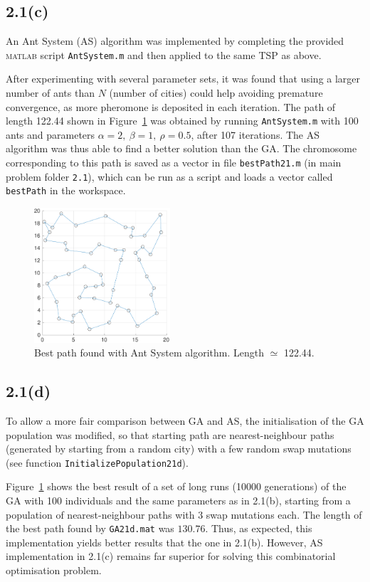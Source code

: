 \documentclass[12pt,titlepage]{article}
\begin{document}
\subsection*{2.1(c)}

An Ant System (AS) algorithm was implemented by completing the provided \textsc{matlab} script \texttt{AntSystem.m} and then applied to the same TSP as above. 

After experimenting with several parameter sets, it was found that using a larger number of ants than $N$ (number of cities) could help avoiding premature convergence, as more pheromone is deposited in each iteration. The path of length 122.44 shown in Figure~\ref{fig:1c} was obtained by running \texttt{AntSystem.m} with 100 ants and parameters $\alpha = 2, \ \beta = 1, \ \rho = 0.5$, after 107 iterations. The AS algorithm was thus able to find a better solution than the GA. The chromosome corresponding to this path is saved as a vector in file \texttt{bestPath21.m} (in main problem folder \texttt{2.1}), which can be run as a script and loads a vector called \texttt{bestPath} in the workspace.

\begin{figure}[htbp]
\centering
\includegraphics[width=0.45\textwidth]{Figures/2c_pathPlot}
\caption{\footnotesize Best path found with Ant System algorithm. Length $\simeq$ 122.44.}
\label{fig:1c}
\end{figure}

\subsection*{2.1(d)}
To allow a more fair comparison between GA and AS, the initialisation of the GA population was modified, so that starting path are nearest-neighbour paths (generated by starting from a random city) with a few random swap mutations (see function \texttt{InitializePopulation21d}).

Figure~\ref{fig:1c} shows the best result of a set of long runs (10000 generations) of the GA with 100 individuals and the same parameters as in 2.1(b), starting from a population of nearest-neighbour paths with 3 swap mutations each.
The length of the best path found by \texttt{GA21d.mat} was $130.76$. Thus, as expected, this implementation yields better results that the one in 2.1(b). However, AS implementation in 2.1(c) remains far superior for solving this combinatorial optimisation problem. 
\end{document}
